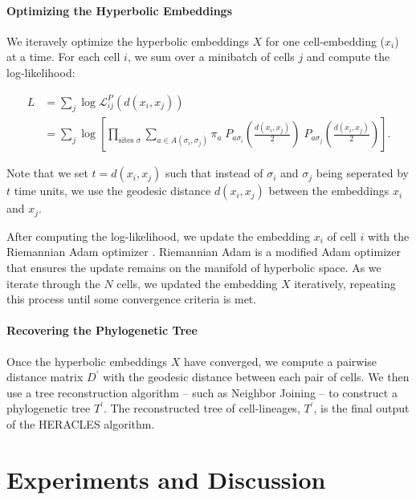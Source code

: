 \documentclass{article}
\begin{document}
\paragraph*{Optimizing the Hyperbolic Embeddings} We iteravely optimize the hyperbolic embeddings $X$ for one cell-embedding ($x_i$) at a time. For each cell $i$, we sum over a minibatch of cells $j$ and compute the log-likelihood:

\begin{align}
  \label{eq:log-likelihood}
  L &= \sum_{j} \log \mathcal{L}_{ij}^P \left( d(x_i, x_j) \right) \\
  &= \sum_{j} \log \left[ \prod_{\textrm{sites } \sigma} \sum_{a \in A(\sigma_i, \sigma_j)} \pi_a \; P_{a \sigma_i} \left( \frac{ d(x_i, x_j)}{2} \right) \;   P_{a \sigma_j} \left( \frac{ d(x_i, x_j)}{2} \right) \right].
\end{align}

Note that we set $t=d(x_i, x_j)$ such that instead of $\sigma_i$ and $\sigma_j$ being seperated by $t$ time units, we use the geodesic distance $d(x_i, x_j)$ between the embeddings $x_i$ and $x_j$.

After computing the log-likelihood, we update the embedding $x_i$ of cell $i$ with the Riemannian Adam optimizer \cite{becigneul2018riemannian}. Riemannian Adam is a modified Adam optimizer \cite{kingma2014adam} that ensures the update remains on the manifold of hyperbolic space. As we iterate through the $N$ cells, we updated the embedding $X$ iteratively, repeating this process until some convergence criteria is met.

\paragraph*{Recovering the Phylogenetic Tree} Once the hyperbolic embeddings $X$ have converged, we compute a pairwise distance matrix $D^\prime$ with the geodesic distance between each pair of cells. We then use a tree reconstruction algorithm -- such as Neighbor Joining -- to construct a phylogenetic tree $T^\prime$. The reconstructed tree of cell-lineages, $T^\prime$, is the final output of the HERACLES algorithm.


\section{Experiments and Discussion}
\end{document}
